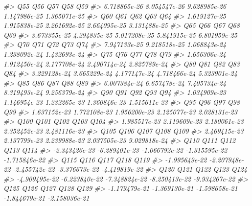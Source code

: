 \documentclass[]{article}
\newenvironment{Shaded}{\begin{snugshade}}{\end{snugshade}}
\newcommand{\CommentTok}[1]{\textcolor[rgb]{0.56,0.35,0.01}{\textit{#1}}}
\begin{document}
\begin{Shaded}
\begin{Highlighting}[]
\CommentTok{#>           Q55           Q56           Q57           Q58           Q59 }
\CommentTok{#>  6.718865e-26  8.054547e-26  9.628985e-26  1.147986e-25  1.365071e-25 }
\CommentTok{#>           Q60           Q61           Q62           Q63           Q64 }
\CommentTok{#>  1.619127e-25  1.915838e-25  2.261692e-25  2.664095e-25  3.131488e-25 }
\CommentTok{#>           Q65           Q66           Q67           Q68           Q69 }
\CommentTok{#>  3.673355e-25  4.294835e-25  5.017208e-25  5.841915e-25  6.801959e-25 }
\CommentTok{#>           Q70           Q71           Q72           Q73           Q74 }
\CommentTok{#>  7.947133e-25  9.218518e-25  1.068843e-24  1.238092e-24  1.432693e-24 }
\CommentTok{#>           Q75           Q76           Q77           Q78           Q79 }
\CommentTok{#>  1.656306e-24  1.912450e-24  2.177708e-24  2.490714e-24  2.825789e-24 }
\CommentTok{#>           Q80           Q81           Q82           Q83           Q84 }
\CommentTok{#>  3.229128e-24  3.665229e-24  4.177147e-24  4.718466e-24  5.323901e-24 }
\CommentTok{#>           Q85           Q86           Q87           Q88           Q89 }
\CommentTok{#>  6.007384e-24  6.657478e-24  7.405734e-24  8.319493e-24  9.256379e-24 }
\CommentTok{#>           Q90           Q91           Q92           Q93           Q94 }
\CommentTok{#>  1.034909e-23  1.146954e-23  1.232265e-23  1.360846e-23  1.515611e-23 }
\CommentTok{#>           Q95           Q96           Q97           Q98           Q99 }
\CommentTok{#>  1.637152e-23  1.772108e-23  1.956200e-23  2.125077e-23  2.028131e-23 }
\CommentTok{#>          Q100          Q101          Q102          Q103          Q104 }
\CommentTok{#>  1.985517e-23  2.119609e-23  2.180061e-23  2.352452e-23  2.481116e-23 }
\CommentTok{#>          Q105          Q106          Q107          Q108          Q109 }
\CommentTok{#>  2.469415e-23  2.137799e-23  2.239988e-23  2.037505e-23  9.029818e-24 }
\CommentTok{#>          Q110          Q111          Q112          Q113          Q114 }
\CommentTok{#> -2.343426e-23 -6.289401e-23 -1.066792e-22 -1.315595e-22 -1.715846e-22 }
\CommentTok{#>          Q115          Q116          Q117          Q118          Q119 }
\CommentTok{#> -1.995649e-22 -2.207948e-22 -2.455742e-22 -3.376673e-22 -4.419819e-22 }
\CommentTok{#>          Q120          Q121          Q122          Q123          Q124 }
\CommentTok{#> -4.909495e-22 -6.223840e-22 -7.348824e-22 -8.250413e-22 -9.934267e-22 }
\CommentTok{#>          Q125          Q126          Q127          Q128          Q129 }
\CommentTok{#> -1.179479e-21 -1.369130e-21 -1.598658e-21 -1.844679e-21 -2.158036e-21 }

\end{Highlighting}
\end{Shaded}
\end{document}
